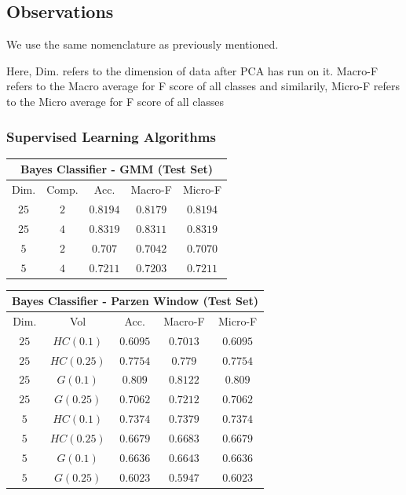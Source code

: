 \documentclass[12pt,journal,compsoc]{IEEEtran}
\begin{document}
\subsection{Observations}
\noindent We use the same nomenclature as previously mentioned. 

\noindent Here, Dim. refers to the dimension of data after PCA has run on it. Macro-F refers to the Macro average for F score of all classes and similarily, Micro-F refers to the Micro average for F score of all classes
\subsubsection{Supervised Learning Algorithms}

\begin{center}
\begin{tabular}{|c|c|c|c|c|}
\multicolumn{5}{c}{Bayes Classifier - GMM (Test Set)}\\
\hline
Dim. & Comp. & Acc. & Macro-F & Micro-F\\
\hline
$25$ &$2$ &$0.8194$ &$0.8179$ &$0.8194$\\
\hline
$25$ &$4$ &$ 0.8319$ &$0.8311$ &$0.8319$\\
\hline
$5$ &$2$ &$0.707$ &$0.7042$ &$0.7070$\\
\hline
$5$ &$4$ &$ 0.7211$ &$0.7203$ &$0.7211$\\
\hline
\end{tabular}
\vspace{0.4cm}

\begin{tabular}{|c|c|c|c|c|}
\multicolumn{5}{c}{Bayes Classifier - Parzen Window (Test Set)}\\
\hline
Dim. & Vol & Acc. & Macro-F & Micro-F\\
\hline
$25$ &$HC(0.1)$ &$0.6095$ &$0.7013$ &$0.6095$\\
\hline
$25$ &$HC(0.25)$ &$ 0.7754$ &$0.779$ &$0.7754$\\
\hline
$25$ &$G(0.1)$ &$ 0.809$ &$0.8122$ &$0.809$\\
\hline
$25$ &$G(0.25)$ &$ 0.7062$ &$0.7212$ &$0.7062$\\
\hline
$5$ &$HC(0.1)$ &$0.7374$ &$0.7379$ &$0.7374$\\
\hline
$5$ &$HC(0.25)$ &$ 0.6679$ &$0.6	683$ &$0.6679$\\
\hline
$5$ &$G(0.1)$ &$0.6636$ &$0.6643$ &$0.6636$\\
\hline
$5$ &$G(0.25)$ &$0.6023$ &$0.5947$ &$0.6023$\\
\hline
\end{tabular}
\vspace*{0.4 cm}


\end{center}
\end{document}
